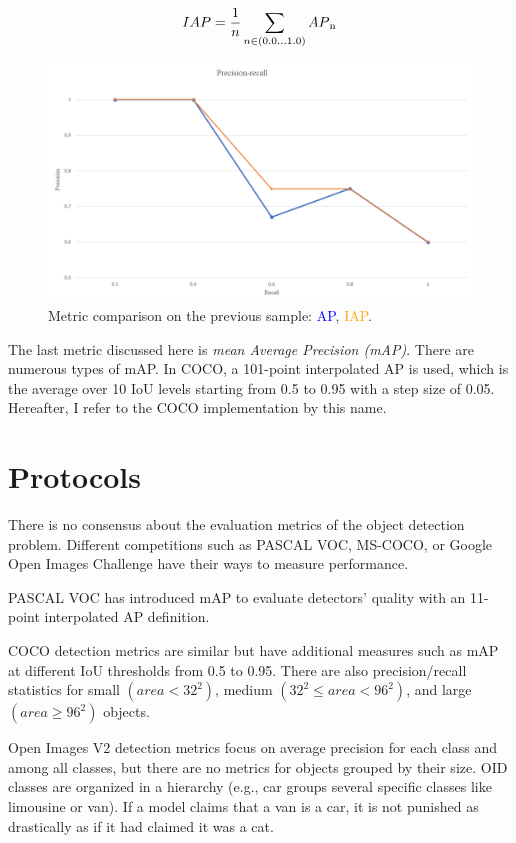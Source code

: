 \[IAP=\frac{1}{n}\sum_{n\in(0.0 ... 1.0)} AP\textsubscript{n}\]

\begin{figure}[htb]
 \centerline{\includegraphics[width=0.8\columnwidth]{.//Figure/Detector/transformed_precision_recall.png}}
 \caption{Metric comparison on the previous sample: \textcolor{blue}{AP}, \textcolor{orange}{IAP}.}
 \label{fig:transformed_precision_recall}
\end{figure}

The last metric discussed here is \textit{mean Average Precision (mAP)}. There are numerous types of mAP. In COCO, a 101-point interpolated AP is used, which is the average over 10 IoU levels starting from 0.5 to 0.95 with a step size of 0.05. Hereafter, I refer to the COCO implementation by this name.

\section{Protocols}

There is no consensus about the evaluation metrics of the object detection problem. Different competitions such as PASCAL VOC\cite{PascalVOC}, MS-COCO\cite{MS-COCO}, or Google Open Images Challenge\cite{OID} have their ways to measure performance\cite{mAP}.

PASCAL VOC\cite{PascalVOC} has introduced mAP to evaluate detectors' quality with an 11-point interpolated AP definition.

COCO detection metrics\cite{MS-COCO} are similar but have additional measures such as mAP at different IoU thresholds from 0.5 to 0.95. There are also precision/recall statistics for small \((area < 32^2)\), medium \((32^2 \leq area < 96^2)\), and large \((area \geq 96^2)\) objects.

Open Images V2 detection metrics\cite{OID} focus on average precision for each class and among all classes, but there are no metrics for objects grouped by their size. OID classes are organized in a hierarchy (e.g., car groups several specific classes like limousine or van). If a model claims that a van is a car, it is not punished as drastically as if it had claimed it was a cat.

